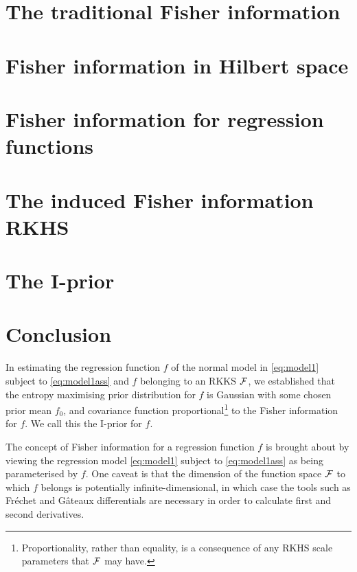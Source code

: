 \documentclass[showframe,11pt,twoside,openright]{report}
\begin{document}
\section{The traditional Fisher information}


\section{Fisher information in Hilbert space}
\label{sec:fihilbert}


\section{Fisher information for regression functions}
\label{sec:firegfun}


\section{The induced Fisher information RKHS}
\label{sec:inducedFisherRKHS}


\section{The I-prior}


\section{Conclusion}

\label{errata3}
In estimating the regression function $f$ of the normal model in \cref{eq:model1} subject to \cref{eq:model1ass} and $f$ belonging to an RKKS ${\mathcal F}$, we established that the entropy maximising prior distribution for $f$ is Gaussian with some chosen prior mean $f_0$, and covariance function proportional\footnote{Proportionality, rather than equality, is a consequence of any RKHS scale parameters that ${\mathcal F}$ may have.} to the Fisher information for $f$.
We call this the I-prior for $f$.

The concept of Fisher information for a regression function $f$ is brought about by viewing the regression model \cref{eq:model1} subject to \cref{eq:model1ass} as being parameterised by $f$.
One caveat is that the dimension of the function space ${\mathcal F}$ to which $f$ belongs is potentially infinite-dimensional, in which case the tools such as Fréchet and Gâteaux differentials are necessary in order to calculate first and second derivatives.
\end{document}
